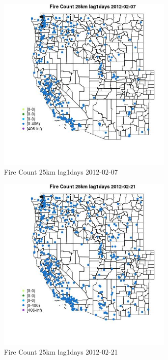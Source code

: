 \begin{figure} 
\centering  
\includegraphics[width=0.77\textwidth]{Code_Outputs/Report_ML_input_PM25_Step4_part_f_de_duplicated_aves_prioritize_24hr_obswNAs_MapObsFire_Count_25km_lag1days2012-02-07.jpg} 
\caption{\label{fig:Report_ML_input_PM25_Step4_part_f_de_duplicated_aves_prioritize_24hr_obswNAsMapObsFire_Count_25km_lag1days2012-02-07}Fire Count 25km lag1days 2012-02-07} 
\end{figure} 
 

\begin{figure} 
\centering  
\includegraphics[width=0.77\textwidth]{Code_Outputs/Report_ML_input_PM25_Step4_part_f_de_duplicated_aves_prioritize_24hr_obswNAs_MapObsFire_Count_25km_lag1days2012-02-21.jpg} 
\caption{\label{fig:Report_ML_input_PM25_Step4_part_f_de_duplicated_aves_prioritize_24hr_obswNAsMapObsFire_Count_25km_lag1days2012-02-21}Fire Count 25km lag1days 2012-02-21} 
\end{figure} 
 

